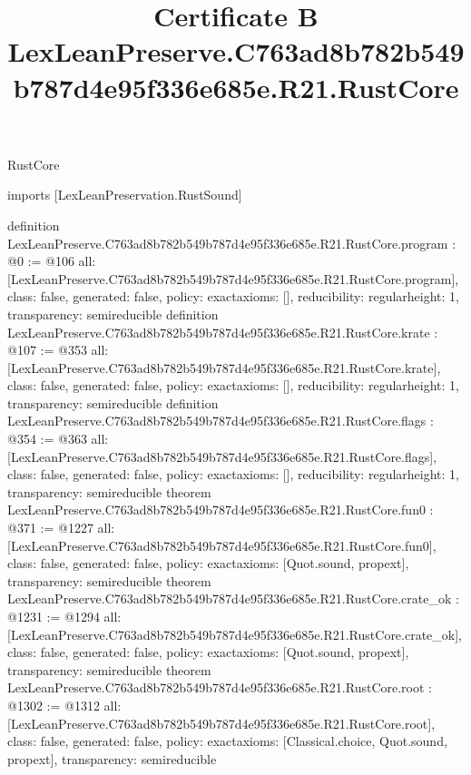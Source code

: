 \begin{lexlean}{RustCore}
\title{Certificate B LexLeanPreserve.C763ad8b782b549b787d4e95f336e685e.R21.RustCore}
\begin{coremodule}
imports [LexLeanPreservation.RustSound]

definition LexLeanPreserve.C763ad8b782b549b787d4e95f336e685e.R21.RustCore.program : @0 := @106 {
  all: [LexLeanPreserve.C763ad8b782b549b787d4e95f336e685e.R21.RustCore.program],
  class: false,
  generated: false,
  policy: exact{axioms: []},
  reducibility: regular{height: 1},
  transparency: semireducible
}
definition LexLeanPreserve.C763ad8b782b549b787d4e95f336e685e.R21.RustCore.krate : @107 := @353 {
  all: [LexLeanPreserve.C763ad8b782b549b787d4e95f336e685e.R21.RustCore.krate],
  class: false,
  generated: false,
  policy: exact{axioms: []},
  reducibility: regular{height: 1},
  transparency: semireducible
}
definition LexLeanPreserve.C763ad8b782b549b787d4e95f336e685e.R21.RustCore.flags : @354 := @363 {
  all: [LexLeanPreserve.C763ad8b782b549b787d4e95f336e685e.R21.RustCore.flags],
  class: false,
  generated: false,
  policy: exact{axioms: []},
  reducibility: regular{height: 1},
  transparency: semireducible
}
theorem LexLeanPreserve.C763ad8b782b549b787d4e95f336e685e.R21.RustCore.fun0 : @371 := @1227 {
  all: [LexLeanPreserve.C763ad8b782b549b787d4e95f336e685e.R21.RustCore.fun0],
  class: false,
  generated: false,
  policy: exact{axioms: [Quot.sound, propext]},
  transparency: semireducible
}
theorem LexLeanPreserve.C763ad8b782b549b787d4e95f336e685e.R21.RustCore.crate_ok : @1231 := @1294 {
  all: [LexLeanPreserve.C763ad8b782b549b787d4e95f336e685e.R21.RustCore.crate_ok],
  class: false,
  generated: false,
  policy: exact{axioms: [Quot.sound, propext]},
  transparency: semireducible
}
theorem LexLeanPreserve.C763ad8b782b549b787d4e95f336e685e.R21.RustCore.root : @1302 := @1312 {
  all: [LexLeanPreserve.C763ad8b782b549b787d4e95f336e685e.R21.RustCore.root],
  class: false,
  generated: false,
  policy: exact{axioms: [Classical.choice, Quot.sound, propext]},
  transparency: semireducible
}


\end{coremodule}
\end{lexlean}
